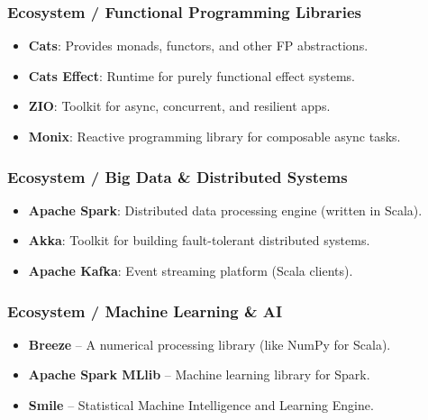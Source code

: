 \documentclass{beamer}
\begin{document}

\begin{frame}
\frametitle{Ecosystem / Functional Programming Libraries }

\begin{itemize}
  \item \textbf{Cats}: Provides monads, functors, and other FP abstractions.
  \item \textbf{Cats Effect}: Runtime for purely functional effect systems.
  \item \textbf{ZIO}: Toolkit for async, concurrent, and resilient apps.
  \item \textbf{Monix}: Reactive programming library for composable async tasks.
\end{itemize}

\end{frame}


\begin{frame}
\frametitle{Ecosystem / Big Data \& Distributed Systems }

\begin{itemize}
  \item \textbf{Apache Spark}: Distributed data processing engine (written in Scala).
  \item \textbf{Akka}: Toolkit for building fault-tolerant distributed systems.
  \item \textbf{Apache Kafka}: Event streaming platform (Scala clients).
\end{itemize}

\end{frame}


\begin{frame}
\frametitle{Ecosystem / Machine Learning \& AI }
\begin{itemize}
  \item \textbf{Breeze} – A numerical processing library (like NumPy for Scala).
  \item \textbf{Apache Spark MLlib} – Machine learning library for Spark.
  \item \textbf{Smile} – Statistical Machine Intelligence and Learning Engine.
\end{itemize}
\end{frame}

\end{document}
